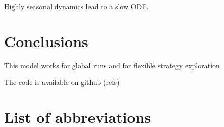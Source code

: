 \documentclass{bmcart}
\begin{document}
Highly seasonal dynamics lead to a slow ODE.

\section*{Conclusions}

This model works for global runs and for flexible strategy exploration

The code is available on github (refs)

\section*{List of abbreviations}

\end{document}
